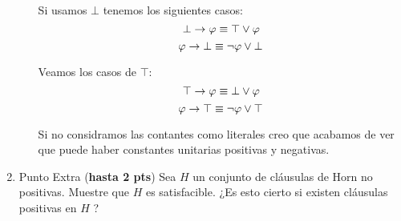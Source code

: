 \documentclass[11pt,letterpaper]{article}
\begin{document}
\begin{enumerate}
\begin{enumerate}
    Si usamos $\bot$ tenemos los siguientes casos:
    $$ \bot\rightarrow \varphi \equiv \top\lor \varphi$$
    $$ \varphi\rightarrow \bot \equiv \neg \varphi \lor \bot$$

    Veamos los casos de $\top$:
    $$ \top\rightarrow \varphi \equiv \bot\lor \varphi$$
    $$ \varphi\rightarrow \top \equiv \neg \varphi \lor \top$$

    Si no considramos las contantes como literales creo que acabamos de ver que puede haber constantes unitarias positivas y negativas.
  \end{enumerate}
  
\medskip
  
\item Punto Extra ({\bf hasta 2 pts})  Sea $H$ un conjunto de cláusulas de Horn no positivas. Muestre que $H$ es satisfacible. ¿Es esto cierto si existen cláusulas positivas en $H$ ?

  
\end{enumerate}
\end{document}
